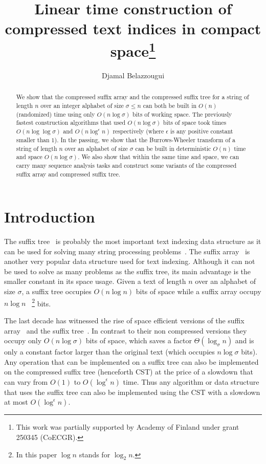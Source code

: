 \documentclass[a4paper]{article}
\begin{document}
\title{Linear time construction of compressed text indices in compact space\thanks{This work was partially supported by Academy of Finland under grant 250345 (CoECGR).}}
\author{Djamal Belazzougui}

\maketitle
\begin{abstract}
We show that the compressed suffix array and the compressed suffix tree for a string of length $n$ over 
an integer alphabet of size $\sigma\leq n$ can both be built in $O(n)$ (randomized) 
time  using only $O(n\log\sigma)$ bits of working space. The previously fastest construction algorithms 
that used $O(n\log\sigma)$ bits of space took times $O(n\log\log\sigma)$ and $O(n\log^{\epsilon}n)$
respectively (where $\epsilon$ is any positive constant smaller than $1$). 
In the passing, we show that the Burrows-Wheeler transform of a string of length $n$ over 
an alphabet of size $\sigma$ can be built in deterministic $O(n)$ time and space 
$O(n\log\sigma)$. 
We also show that within the same time and space, we can carry many sequence analysis tasks
and construct some variants of the compressed suffix array and compressed suffix tree.

\end{abstract}
\section{Introduction}
The suffix tree~\cite{Wei73} is probably the most important text indexing data structure as it can be used for solving many string processing problems~\cite{Ap85,Gu97}. The suffix array~\cite{MM93} is another very popular data structure used for text indexing. 
Although it can not be used to solve as many problems as the suffix tree, its main advantage is the smaller constant in its space usage. 
Given a text of length $n$ over an alphabet of 
size $\sigma$, a suffix tree occupies $O(n\log n)$ bits of space while a suffix array occupy $n\log n$
~\footnote{In this paper $\log n$ stands for $\log_2 n$.} bits. 

The last decade has witnessed the rise of space efficient versions of the suffix array~\cite{GV05,FM05} and the suffix tree~\cite{Sa07a}. In contrast to their non compressed versions they occupy only $O(n\log\sigma)$ bits of space, which saves a factor $\Theta(\log_\sigma n)$ and is only a constant factor larger than the original text (which occupies $n\log\sigma$ bits). 
Any operation that can be implemented on a suffix tree can also be implemented on the compressed suffix tree (henceforth \textsc{CST}) at the price of a slowdown that can vary from $O(1)$ to $O(\log^\epsilon n)$ time. Thus any algorithm or data structure that uses the suffix tree can also be implemented using the \textsc{CST} with a slowdown at most $O(\log^\epsilon n)$. 
\end{document}
